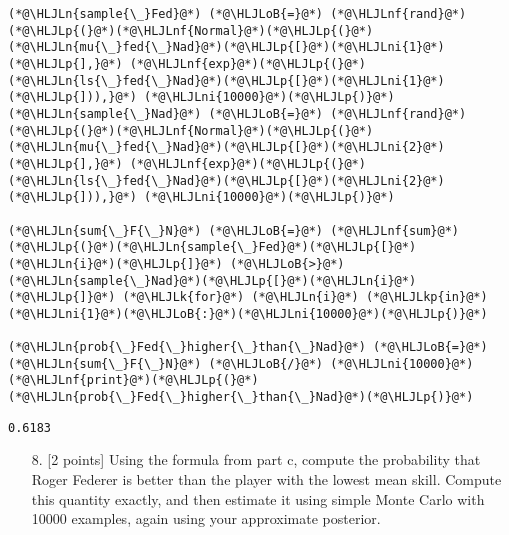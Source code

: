 \documentclass[12pt,a4paper]{article}
\newcommand{\HLJLk}[1]{\textcolor[RGB]{148,91,176}{\textbf{#1}}}
\newcommand{\HLJLkp}[1]{\textcolor[RGB]{148,91,176}{\textbf{#1}}}
\newcommand{\HLJLn}[1]{#1}
\newcommand{\HLJLnf}[1]{\textcolor[RGB]{66,102,213}{#1}}
\newcommand{\HLJLni}[1]{\textcolor[RGB]{59,151,46}{#1}}
\newcommand{\HLJLoB}[1]{\textcolor[RGB]{102,102,102}{\textbf{#1}}}
\newcommand{\HLJLp}[1]{#1}
\begin{document}
\begin{lstlisting}
(*@\HLJLn{sample{\_}Fed}@*) (*@\HLJLoB{=}@*) (*@\HLJLnf{rand}@*)(*@\HLJLp{(}@*)(*@\HLJLnf{Normal}@*)(*@\HLJLp{(}@*)(*@\HLJLn{mu{\_}fed{\_}Nad}@*)(*@\HLJLp{[}@*)(*@\HLJLni{1}@*)(*@\HLJLp{],}@*) (*@\HLJLnf{exp}@*)(*@\HLJLp{(}@*)(*@\HLJLn{ls{\_}fed{\_}Nad}@*)(*@\HLJLp{[}@*)(*@\HLJLni{1}@*)(*@\HLJLp{])),}@*) (*@\HLJLni{10000}@*)(*@\HLJLp{)}@*)
(*@\HLJLn{sample{\_}Nad}@*) (*@\HLJLoB{=}@*) (*@\HLJLnf{rand}@*)(*@\HLJLp{(}@*)(*@\HLJLnf{Normal}@*)(*@\HLJLp{(}@*)(*@\HLJLn{mu{\_}fed{\_}Nad}@*)(*@\HLJLp{[}@*)(*@\HLJLni{2}@*)(*@\HLJLp{],}@*) (*@\HLJLnf{exp}@*)(*@\HLJLp{(}@*)(*@\HLJLn{ls{\_}fed{\_}Nad}@*)(*@\HLJLp{[}@*)(*@\HLJLni{2}@*)(*@\HLJLp{])),}@*) (*@\HLJLni{10000}@*)(*@\HLJLp{)}@*)

(*@\HLJLn{sum{\_}F{\_}N}@*) (*@\HLJLoB{=}@*) (*@\HLJLnf{sum}@*)(*@\HLJLp{(}@*)(*@\HLJLn{sample{\_}Fed}@*)(*@\HLJLp{[}@*)(*@\HLJLn{i}@*)(*@\HLJLp{]}@*) (*@\HLJLoB{>}@*) (*@\HLJLn{sample{\_}Nad}@*)(*@\HLJLp{[}@*)(*@\HLJLn{i}@*)(*@\HLJLp{]}@*) (*@\HLJLk{for}@*) (*@\HLJLn{i}@*) (*@\HLJLkp{in}@*) (*@\HLJLni{1}@*)(*@\HLJLoB{:}@*)(*@\HLJLni{10000}@*)(*@\HLJLp{)}@*)

(*@\HLJLn{prob{\_}Fed{\_}higher{\_}than{\_}Nad}@*) (*@\HLJLoB{=}@*) (*@\HLJLn{sum{\_}F{\_}N}@*) (*@\HLJLoB{/}@*) (*@\HLJLni{10000}@*)
(*@\HLJLnf{print}@*)(*@\HLJLp{(}@*)(*@\HLJLn{prob{\_}Fed{\_}higher{\_}than{\_}Nad}@*)(*@\HLJLp{)}@*)
\end{lstlisting}

\begin{lstlisting}
0.6183
\end{lstlisting}


\begin{itemize}
\item[8. ] [2 points] Using the formula from part c, compute the probability that Roger Federer is better than the player with the lowest mean skill. Compute this quantity exactly, and then estimate it using simple Monte Carlo with 10000 examples, again using your approximate posterior.

\end{itemize}
\end{document}
